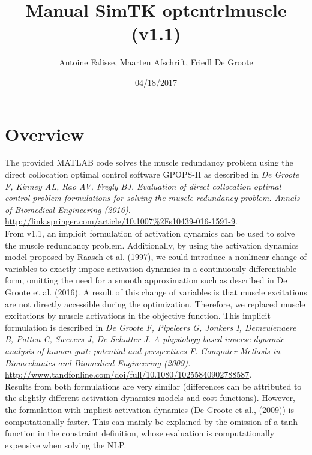 \documentclass[a4paper,oneside,11pt]{article}
\begin{document}
\title{Manual SimTK optcntrlmuscle (v1.1)}
\author{Antoine Falisse, Maarten Afschrift, Friedl De Groote}
\date{04/18/2017} 
\maketitle
\tableofcontents

\section{Overview}

The provided MATLAB code solves the muscle redundancy problem using the direct collocation optimal control software GPOPS-II as described in \textit{De Groote F, Kinney AL, Rao AV, Fregly BJ. Evaluation of direct collocation optimal control problem formulations for solving the muscle redundancy problem. Annals of Biomedical Engineering (2016).} \url{http://link.springer.com/article/10.1007%2Fs10439-016-1591-9}. 
\\

From v1.1, an implicit formulation of activation dynamics can be used to solve the muscle redundancy problem. Additionally, by using the activation dynamics model proposed by Raasch et al. (1997), we could introduce a nonlinear change of variables to exactly impose activation dynamics in a continuously differentiable form, omitting the need for a smooth approximation such as described in De Groote et al. (2016). A result of this change of variables is that muscle excitations are not directly accessible during the optimization. Therefore, we replaced muscle excitations by muscle activations in the objective function. This implicit formulation is described in \textit{De Groote F, Pipeleers G, Jonkers I, Demeulenaere B, Patten C, Swevers J, De Schutter J. A physiology based inverse dynamic analysis of human gait: potential and perspectives F. Computer Methods in Biomechanics and Biomedical Engineering (2009).} \url{http://www.tandfonline.com/doi/full/10.1080/10255840902788587}.  \\

Results from both formulations are very similar (differences can be attributed to the slightly different activation dynamics models and cost functions). However, the formulation with implicit activation dynamics (De Groote et al., (2009)) is computationally faster. This can mainly be explained by the omission of a tanh function in the constraint definition, whose evaluation is computationally expensive when solving the NLP.
\end{document}
